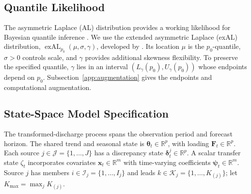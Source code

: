 \documentclass[APA,STIX1COL]{WileyNJD-v2}
\begin{document}
\subsection{Quantile Likelihood}
\label{subsec:exal}

The asymmetric Laplace (AL) distribution provides a working likelihood for Bayesian quantile inference \citep{yu2001bayesian, sriram2013theoretical}. We use the extended asymmetric Laplace (exAL) distribution, \(\operatorname{exAL}_{p_0}(\mu,\sigma,\gamma)\), developed by \citet{yan2025new}. Its location \(\mu\) is the \(p_0\)-quantile, \(\sigma>0\) controls scale, and \(\gamma\) provides additional skewness flexibility. To preserve the specified quantile, \(\gamma\) lies in an interval \((L_\gamma(p_0),U_\gamma(p_0))\) whose endpoints depend on \(p_0\). Subsection~\ref{app:augmentation} gives the endpoints and computational augmentation.

\subsection{State-Space Model Specification}
\label{subsec:fullmodel}

The transformed-discharge process spans the observation period and forecast horizon. The shared trend and seasonal state is $\boldsymbol\theta_t\in\mathbb R^p$, with loading $\mathbf F_t\in\mathbb R^p$. Each source $j\in\mathcal J=\{1,\ldots,J\}$ has a discrepancy state $\boldsymbol\delta_t^j\in\mathbb R^p$. A scalar transfer state $\zeta_t$ incorporates covariates $\mathbf x_t\in\mathbb R^m$ with time-varying coefficients $\boldsymbol\psi_t\in\mathbb R^m$. Source $j$ has members $i\in\mathcal I_j=\{1,\ldots,I_j\}$ and leads $k\in\mathcal K_j=\{1,\ldots,K_{(j)}\}$; let $K_{\max}=\max_jK_{(j)}$.
\end{document}
